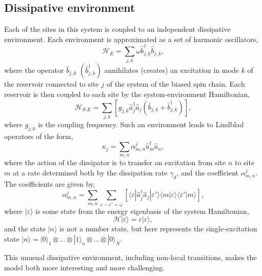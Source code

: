 \subsection{Dissipative environment}
Each of the sites in this system is coupled to an independent dissipative environment. Each environment is approximated as a set of harmonic oscillators,
\begin{equation}
	\mathcal{H}_{E} = \sum_{j,k} \omega\hat{b}_{j,k}^{\dagger}\hat{b}_{j,k},
	\label{eq:fw1-3}
\end{equation}
where the operator \(\hat{b}_{j,k}\) \((\hat{b}_{j,k}^{\dagger})\) annihilates (creates) an excitation in mode \(k\) of the reservoir connected to site \(j\) of the system of the biased spin chain. Each reservoir is then coupled to each site by the system-environment Hamiltonian,
\begin{equation}
	\mathcal{H}_{S\text{-}E} = \sum_{j,k} \left[ g_{j,k}\hat{a}_{j}^{\dagger}\hat{a}_{j}\left( \hat{b}_{j,k} + \hat{b}_{j,k}^{\dagger} \right)\right],
	\label{eq:fw1-4}
\end{equation}
where \(g_{j,k}\) is the coupling frequency. Such an environment leads to Lindblad operators of the form,
\begin{equation}
	\kappa_{j} = \sum_{m,n} \alpha_{m,n}^{j} \hat{a}_{m}^{\dagger}\hat{a}_{n},
	\label{eq:fw1-5}
\end{equation}
where the action of the dissipator is to transfer an excitation from site \(n\) to site \(m\) at a rate determined both by the dissipation rate \(\gamma_{d}\), and the coefficient \(\alpha_{m,n}^{j}\). The coefficients are given by,
\begin{equation}
	\alpha_{m,n}^{j} = \sum_{m,n} \sum_{\varepsilon - \varepsilon' = \omega} \left[ \langle \varepsilon | \hat{a}_{j}^{\dagger}\hat{a}_{j} | \varepsilon' \rangle \langle m |\varepsilon \rangle \langle \varepsilon' | m \rangle \right], 
	\label{eq:fw1-6}
\end{equation}
where \(|\varepsilon \rangle\) is some state from the energy eigenbasis of the system Hamiltonian,
\begin{equation}
	\mathcal{H}|\varepsilon \rangle = \varepsilon|\varepsilon\rangle,
	\label{eq:fw1-7}
\end{equation}
and the state \(|n\rangle\) is not a number state, but here represents the single-excitation state \(|n \rangle = | 0 \rangle_{1} \otimes \ldots \otimes | 1 \rangle_{n} \otimes \ldots \otimes |0 \rangle_{N}\). 

This unusual dissipative environment, including non-local transitions, makes the model both more interesting and more challenging. 

